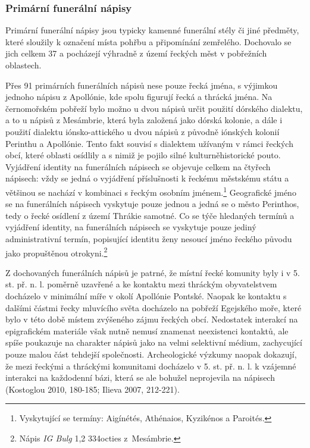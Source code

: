 \subsubsection[primární-funerální-nápisy]{Primární funerální nápisy}

Primární funerální nápisy jsou typicky kamenné funerální stély či jiné předměty, které sloužily k označení místa pohřbu a připomínání zemřelého. Dochovalo se jich celkem 37 a pocházejí výhradně z území řeckých měst v pobřežních oblastech.

Přes 91  primárních funerálních nápisů nese pouze řecká jména, s výjimkou jednoho nápisu z Apollónie, kde spolu figurují řecká a thrácká jména. Na černomořském pobřeží bylo možno u dvou nápisů určit použití dórského dialektu, a to u nápisů z Mesámbrie, která byla založená jako dórská kolonie, a dále i použití dialektu iónsko-attického u dvou nápisů z původně iónských kolonií Perinthu a Apollónie. Tento fakt souvisí s dialektem užívaným v rámci řeckých obcí, které oblasti osídlily a s nimiž je pojilo silné kulturněhistorické pouto. Vyjádření identity na funerálních nápisech se objevuje celkem na čtyřech nápisech: vždy se jedná o vyjádření příslušnosti k řeckému městskému státu a většinou se nachází v kombinaci s řeckým osobním jménem.\footnote{Vyskytující se termíny: Aigínétés, Athénaios, Kyzikénos a Paroités.} Geografické jméno se na funerálních nápisech vyskytuje pouze jednou a jedná se o město Perinthos, tedy o řecké osídlení z území Thrákie samotné. Co se týče hledaných termínů a vyjádření identity, na funerálních nápisech se vyskytuje pouze jediný administrativní termín, popisující identitu ženy nesoucí jméno řeckého původu jako propuštěnou otrokyni.\footnote{Nápis {\em IG Bulg} 1,2 334octies z~Mesámbrie.}

Z dochovaných funerálních nápisů je patrné, že místní řecké komunity byly i v 5. st. př. n. l. poměrně uzavřené a ke kontaktu mezi thráckým obyvatelstvem docházelo v minimální míře v okolí Apollónie Pontské. Naopak ke kontaktu s dalšími částmi řecky mluvícího světa docházelo na pobřeží Egejského moře, které bylo v této době místem zvýšeného zájmu řeckých obcí. Nedostatek interakcí na epigrafickém materiále však nutně nemusí znamenat neexistenci kontaktů, ale spíše poukazuje na charakter nápisů jako na velmi selektivní médium, zachycující pouze malou část tehdejší společnosti. Archeologické výzkumy naopak dokazují, že mezi řeckými a thráckými komunitami docházelo v 5. st. př. n. l. k vzájemné interakci na každodenní bázi, která se ale bohužel neprojevila na nápisech (Kostoglou 2010, 180-185; Ilieva 2007, 212-221).

